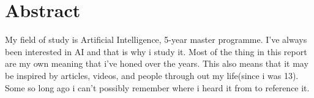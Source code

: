 \chapter*{Abstract}
My field of study is Artificial Intelligence, 5-year master programme. I've always been interested in AI and that is why i study it. Most of the thing in this report are my own meaning that i've honed over the years. This also means that it may be inspired by articles, videos, and people through out my life(since i was 13). Some so long ago i can't possibly remember where i heard it from to reference it.